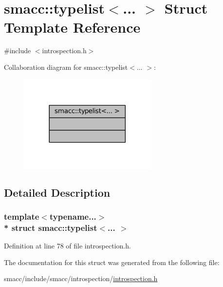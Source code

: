 \hypertarget{structsmacc_1_1typelist}{}\section{smacc\+:\+:typelist$<$... $>$ Struct Template Reference}
\label{structsmacc_1_1typelist}


{\ttfamily \#include $<$introspection.\+h$>$}



Collaboration diagram for smacc\+:\+:typelist$<$... $>$\+:
\nopagebreak
\begin{figure}[H]
\begin{center}
\leavevmode
\includegraphics[width=197pt]{structsmacc_1_1typelist__coll__graph}
\end{center}
\end{figure}


\subsection{Detailed Description}
\subsubsection*{template$<$typename...$>$\\*
struct smacc\+::typelist$<$... $>$}



Definition at line 78 of file introspection.\+h.



The documentation for this struct was generated from the following file\+:\begin{DoxyCompactItemize}
\item 
smacc/include/smacc/introspection/\hyperlink{introspection_8h}{introspection.\+h}\end{DoxyCompactItemize}
